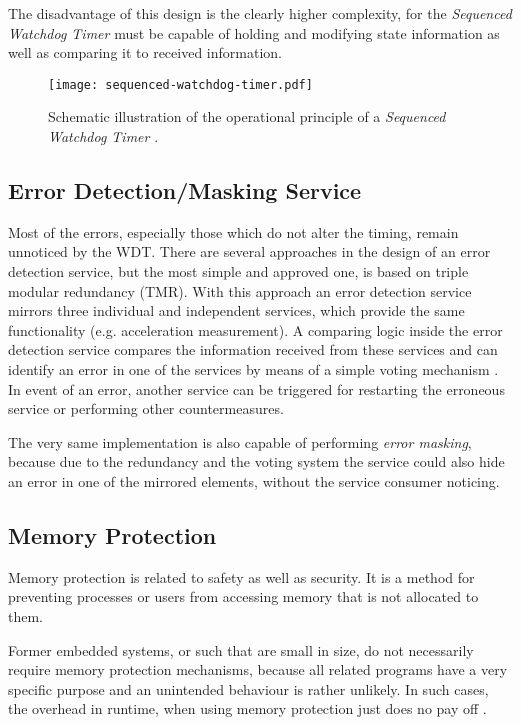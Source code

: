\begin{description}
The disadvantage of this design is the clearly higher complexity, for the \emph{Sequenced Watchdog Timer} must be capable of holding and modifying state information as well as comparing it to received information.

\begin{figure}[!htbp]
\centering
\texttt{[image: sequenced-watchdog-timer.pdf]}
\caption{Schematic illustration of the operational principle of a \emph{Sequenced Watchdog Timer} \cite{elattar2007}.}
\label{fig:sequenced-watchdog-timer}
\end{figure}

\end{description}






\subsection{Error Detection/Masking Service}
\label{sec:error-detection-service}

Most of the errors, especially those which do not alter the timing, remain unnoticed by the WDT. There are several approaches in the design of an error detection service, but the most simple and approved one, is based on triple modular redundancy (TMR). With this approach an error detection service mirrors three individual and independent services, which provide the same functionality (e.g. acceleration measurement). A comparing logic inside the error detection service compares the information received from these services and can identify an error in one of the services by means of a simple voting mechanism \cite{wiki_tmr}. In event of an error, another service can be triggered for restarting the erroneous service or performing other countermeasures.

The very same implementation is also capable of performing \emph{error masking}, because due to the redundancy and the voting system the service could also hide an error in one of the mirrored elements, without the service consumer noticing.


\subsection{Memory Protection}
Memory protection is related to safety as well as security. It is a method for preventing processes or users from accessing memory that is not allocated to them.

Former embedded systems, or such that are small in size, do not necessarily require memory protection mechanisms, because all related programs have a very specific purpose and an unintended behaviour is rather unlikely. In such cases, the overhead in runtime, when using memory protection just does no pay off \cite{yamada2008}. 

